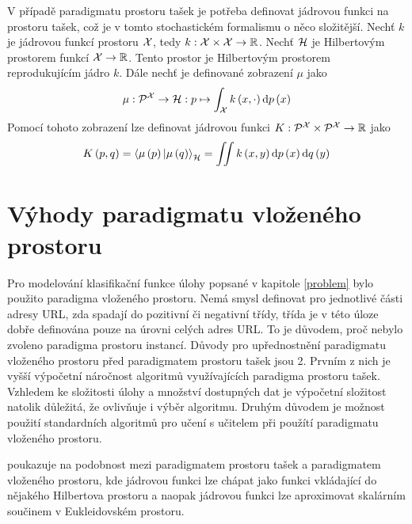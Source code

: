 V případě paradigmatu prostoru tašek je potřeba definovat jádrovou funkci na prostoru tašek, což je v tomto stochastickém formalismu o něco složitější. Nechť \( k \) je jádrovou funkcí prostoru \( \mathcal X \), tedy \( k : \mathcal X \times \mathcal X \to \mathbb R \). Nechť \( \mathcal H \) je Hilbertovým prostorem funkcí \( \mathcal X \to \mathbb R \). Tento prostor je Hilbertovým prostorem reprodukujícím jádro \( k \). Dále nechť je definované zobrazení \( \mu \) jako
\[ \mu : \mathcal P^{\mathcal X} \to \mathcal H : p \mapsto \int_{\mathcal X} k \left( x, \cdot \right) \mathrm{d}p \left( x \right) \]
Pomocí tohoto zobrazení lze definovat jádrovou funkci \( K : \mathcal P^{\mathcal X} \times \mathcal P^{\mathcal X} \to \mathbb R \) jako
\[ K \left( p, q \right) = \braket{\mu \left( p \right) | \mu \left( q \right)}_{\mathcal H} = \iint k \left( x, y \right) \mathrm{d} p \left( x \right) \mathrm{d} q \left( y \right) \]

\section{Výhody paradigmatu vloženého prostoru}
Pro modelování klasifikační funkce úlohy popsané v kapitole \ref{problem} bylo použito paradigma vloženého prostoru. Nemá smysl definovat pro jednotlivé části adresy URL, zda spadají do pozitivní či negativní třídy, třída je v této úloze dobře definována pouze na úrovni celých adres URL. To je důvodem, proč nebylo zvoleno paradigma prostoru instancí. Důvody pro upřednostnění paradigmatu vloženého prostoru před paradigmatem prostoru tašek jsou 2. Prvním z nich je vyšší výpočetní náročnost algoritmů využívajících paradigma prostoru tašek. Vzhledem ke složitosti úlohy a množství dostupných dat je výpočetní složitost natolik důležitá, že ovlivňuje i výběr algoritmu. Druhým důvodem je možnost použití standardních algoritmů pro učení s učitelem při použítí paradigmatu vloženého prostoru.
\begin{remark}
	\cite{pevny_using_2016} poukazuje na podobnost mezi paradigmatem prostoru tašek a paradigmatem vloženého prostoru, kde jádrovou funkci lze chápat jako funkci vkládající do nějakého Hilbertova prostoru a naopak jádrovou funkci lze aproximovat skalárním součinem v Eukleidovském prostoru.
\end{remark}
